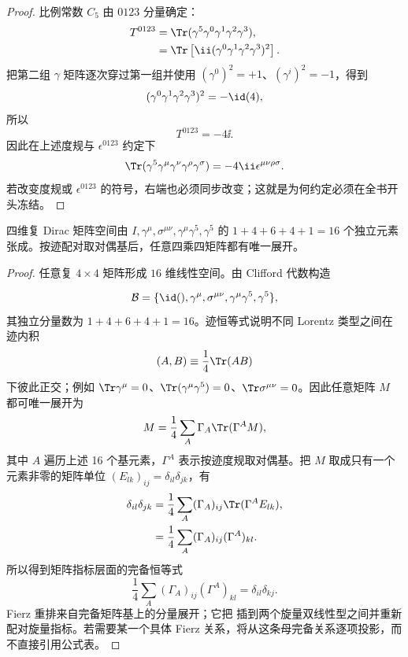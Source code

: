 \begin{proof}
比例常数 $C_5$ 由 $0123$ 分量确定：
\begin{align*}
 T^{0123}
 &=\Tr(\gamma^5\gamma^0\gamma^1\gamma^2\gamma^3),\\
 &=\Tr\left[
 \ii(\gamma^0\gamma^1\gamma^2\gamma^3)^2
 \right].
\end{align*}
把第二组 $\gamma$ 矩阵逐次穿过第一组并使用
$(\gamma^0)^2=+1$、$(\gamma^i)^2=-1$，得到
\begin{equation*}
 (\gamma^0\gamma^1\gamma^2\gamma^3)^2=-\id(4),
\end{equation*}
所以
\begin{equation*}
 T^{0123}=-4\ii.
\end{equation*}
因此在上述度规与 $\epsilon^{0123}$ 约定下
\begin{equation*}
 {
 \Tr(\gamma^5\gamma^\mu\gamma^\nu\gamma^\rho\gamma^\sigma)
 =-4\ii\epsilon^{\mu\nu\rho\sigma}.}
 \end{equation*}
若改变度规或 $\epsilon^{0123}$ 的符号，右端也必须同步改变；这就是为何约定必须在全书开头冻结。
\end{proof}

\begin{proposition}
四维复 Dirac 矩阵空间由 $I,\gamma^\mu,\sigma^{\mu\nu},\gamma^\mu\gamma^5,\gamma^5$ 的 $1+4+6+4+1=16$ 个独立元素张成。按迹配对取对偶基后，任意四乘四矩阵都有唯一展开。
\end{proposition}

\begin{proof}
任意复 $4\times4$ 矩阵形成 $16$ 维线性空间。由 Clifford 代数构造

\begin{equation*}
 \mathcal B=
 \{\id(),\gamma^\mu,\sigma^{\mu\nu},\gamma^\mu\gamma^5,\gamma^5\},
 \end{equation*}
其独立分量数为
$1+4+6+4+1=16$。迹恒等式说明不同 Lorentz 类型之间在迹内积
\begin{equation*}
 (A,B)\equiv\frac14\Tr(AB)
\end{equation*}
下彼此正交；例如 $\Tr\gamma^\mu=0$、$\Tr(\gamma^\mu\gamma^5)=0$、$\Tr\sigma^{\mu\nu}=0$。因此任意矩阵 $M$ 都可唯一展开为
\begin{equation*}
 M=\frac14\sum_A \Gamma_A\Tr(\Gamma^A M),
 \end{equation*}
其中 $A$ 遍历上述 16 个基元素，$\Gamma^A$ 表示按迹度规取对偶基。把 $M$ 取成只有一个元素非零的矩阵单位 $(E_{lk})_{ij}=\delta_{il}\delta_{jk}$，有
\begin{align*}
 \delta_{il}\delta_{jk}
 &=\frac14\sum_A(\Gamma_A)_{ij}
 \Tr(\Gamma^A E_{lk}),\\
 &=\frac14\sum_A(\Gamma_A)_{ij}(\Gamma^A)_{kl}.
\end{align*}
所以得到矩阵指标层面的完备恒等式
\begin{equation*}
 {
 \frac14\sum_A
 (\Gamma_A)_{ij}(\Gamma^A)_{kl}
 =\delta_{il}\delta_{kj}.}
 \end{equation*}
Fierz 重排来自完备矩阵基上的分量展开；它把
插到两个旋量双线性型之间并重新配对旋量指标。若需要某一个具体 Fierz 关系，将从这条母完备关系逐项投影，而不直接引用公式表。
\end{proof}

